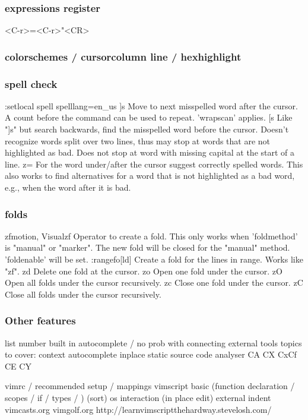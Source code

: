 \documentclass{beamer}
\begin{document}
\begin{frame}
  \frametitle{expressions register}
  <C-r>=<C-r>"<CR>
\end{frame}

\begin{frame}
  \frametitle{colorschemes / cursorcolumn line / hexhighlight}
\end{frame}

\begin{frame}
  \frametitle{spell check}
      :setlocal spell spelllang=en\_us
    ]s          Move to next misspelled word after the cursor.
    A count before the command can be used to repeat.
    'wrapscan' applies.
    [s          Like "]s" but search backwards, find the misspelled
    word before the cursor.  Doesn't recognize words
    split over two lines, thus may stop at words that are
    not highlighted as bad.  Does not stop at word with
    missing capital at the start of a line.
    z=          For the word under/after the cursor suggest correctly
    spelled words.  This also works to find alternatives
    for a word that is not highlighted as a bad word,
    e.g., when the word after it is bad.
\end{frame}

\begin{frame}
    \frametitle{folds}
    zf{motion}, {Visual}zf  Operator to create a fold.  This only works when 'foldmethod' is "manual" or "marker".  The new fold will be closed for the "manual" method.  'foldenable' will be set.
    :{range}fo[ld]   Create a fold for the lines in {range}.  Works like "zf".
    zd      Delete one fold at the cursor.
    zo      Open one fold under the cursor.
    zO      Open all folds under the cursor recursively.
    zc      Close one fold under the cursor.
    zC      Close all folds under the cursor recursively.
\end{frame}

\begin{frame}
  \frametitle{Other features}
  list number
    built in autocomplete / no prob with connecting external tools
    topics to cover:
    context autocomplete
    inplace static source code analyser
    CA CX CxCf CE CY
\end{frame}

\begin{frame}
    vimrc / recommended setup / mappings vimscript basic (function declaration / scopes / if / types / )
    (sort)
    os interaction (in place edit)
    external indent
    vimcasts.org
    vimgolf.org
    http://learnvimscriptthehardway.stevelosh.com/
\end{frame}
\end{document}
